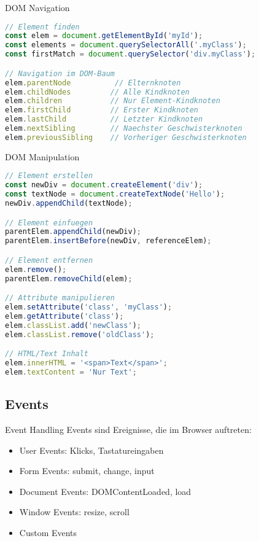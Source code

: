 \begin{KR}{DOM Navigation}
\begin{lstlisting}[language=JavaScript, style=basesmol]
// Element finden
const elem = document.getElementById('myId');
const elements = document.querySelectorAll('.myClass');
const firstMatch = document.querySelector('div.myClass');

// Navigation im DOM-Baum
elem.parentNode          // Elternknoten
elem.childNodes         // Alle Kindknoten
elem.children           // Nur Element-Kindknoten
elem.firstChild         // Erster Kindknoten
elem.lastChild          // Letzter Kindknoten
elem.nextSibling        // Naechster Geschwisterknoten
elem.previousSibling    // Vorheriger Geschwisterknoten
\end{lstlisting}
\end{KR}

\begin{KR}{DOM Manipulation}
\begin{lstlisting}[language=JavaScript, style=basesmol]
// Element erstellen
const newDiv = document.createElement('div');
const textNode = document.createTextNode('Hello');
newDiv.appendChild(textNode);

// Element einfuegen
parentElem.appendChild(newDiv);
parentElem.insertBefore(newDiv, referenceElem);

// Element entfernen
elem.remove();
parentElem.removeChild(elem);

// Attribute manipulieren
elem.setAttribute('class', 'myClass');
elem.getAttribute('class');
elem.classList.add('newClass');
elem.classList.remove('oldClass');

// HTML/Text Inhalt
elem.innerHTML = '<span>Text</span>';
elem.textContent = 'Nur Text';
\end{lstlisting}
\end{KR}

\subsection{Events}

\begin{concept}{Event Handling}
    Events sind Ereignisse, die im Browser auftreten:
    \begin{itemize}
        \item User Events: Klicks, Tastatureingaben
        \item Form Events: submit, change, input
        \item Document Events: DOMContentLoaded, load
        \item Window Events: resize, scroll
        \item Custom Events
    \end{itemize}
\end{concept}

